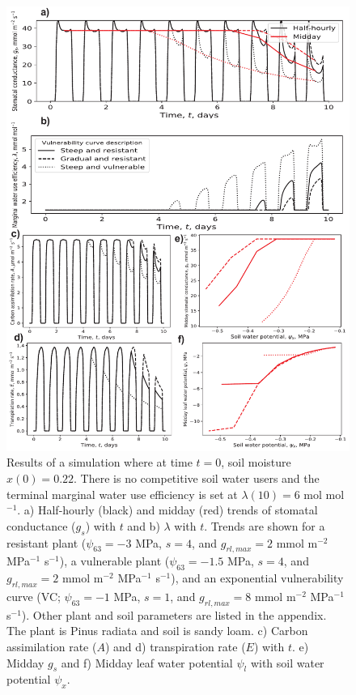 \documentclass[utf8]{frontiersSCNS} %
\begin{document}
\begin{figure}[h]
    \begin{center}
         \includegraphics[scale=0.65]{WUS_no_comp.pdf} 
    \end{center}
    \caption{Results of a simulation where at time $t=0$, soil moisture $x(0) =0.22$. There is no competitive soil water users and the terminal marginal water use efficiency is set at $\lambda(10) = 6$ mol mol$^{-1}$. a) Half-hourly (black) and midday (red) trends of stomatal conductance ($g_s$) with $t$ and b) $\lambda$ with $t$. Trends are shown for a resistant plant ($\psi_{63} = -3$ MPa, $s=4$, and $g_{rl,max} = 2$ mmol m$^{-2}$ MPa$^{-1}$ s$^{-1}$), a vulnerable plant ($\psi_{63} = -1.5$ MPa, $s=4$, and $g_{rl,max} = 2$ mmol m$^{-2}$ MPa$^{-1}$ s$^{-1}$), and an exponential vulnerability curve (VC; $\psi_{63} = -1$ MPa, $s=1$, and $g_{rl,max} = 8$ mmol m$^{-2}$ MPa$^{-1}$ s$^{-1}$). Other plant and soil parameters are listed in the appendix. The plant is Pinus radiata and soil is sandy loam. c) Carbon assimilation rate ($A$) and d) transpiration rate ($E$) with $t$. e) Midday $g_s$ and f) Midday leaf water potential $\psi_l$ with soil water potential $\psi_x$.}
    \label{fig:WUS_no_comp}
\end{figure}
\end{document}
